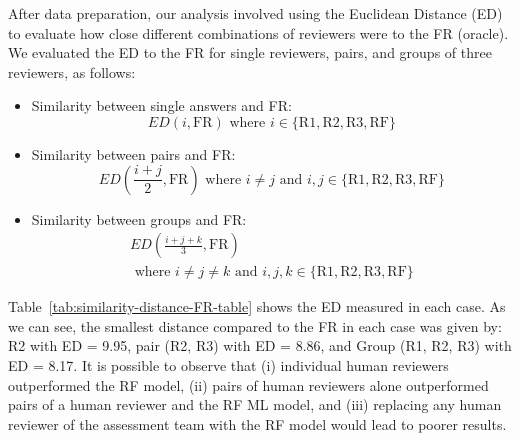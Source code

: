 After data preparation, our analysis involved using the Euclidean Distance (ED) to evaluate how close different combinations of reviewers were to the FR (oracle). We evaluated the ED to the FR for single reviewers, pairs, and groups of three reviewers, as follows:
\begin{itemize}
    \item Similarity between single answers and FR: 
    \[
    \textit{ED}\left(i, \text{FR}\right) \text{ where } i \in \{\text{R1}, \text{R2}, \text{R3}, \text{RF}\}
    \]
    \item Similarity between pairs and FR:
    \[
    \textit{ED}\left(\frac{i + j}{2}, \text{FR}\right) \text{ where } i \neq j \text{ and } i, j \in \{\text{R1}, \text{R2}, \text{R3}, \text{RF}\}
    \]
    \item Similarity between groups and FR:
    \begin{multline}
    \textit{ED}\left(\frac{i + j + k}{3}, \text{FR}\right) \\ 
    \text{ where } i \neq j \neq k \text{ and } i, j, k \in \{\text{R1}, \text{R2}, \text{R3}, \text{RF}\}
    \end{multline}
\end{itemize}

Table~\ref{tab:similarity-distance-FR-table} shows the ED measured in each case. As we can see, the smallest distance compared to the FR in each case was given by: R2 with ED = 9.95, pair (R2, R3) with ED = 8.86, and Group (R1, R2, R3) with ED = 8.17. It is possible to observe that (i) individual human reviewers outperformed the RF model, (ii) pairs of human reviewers alone outperformed pairs of a human reviewer and the RF ML model, and (iii) replacing any human reviewer of the assessment team with the RF model would lead to poorer results.

